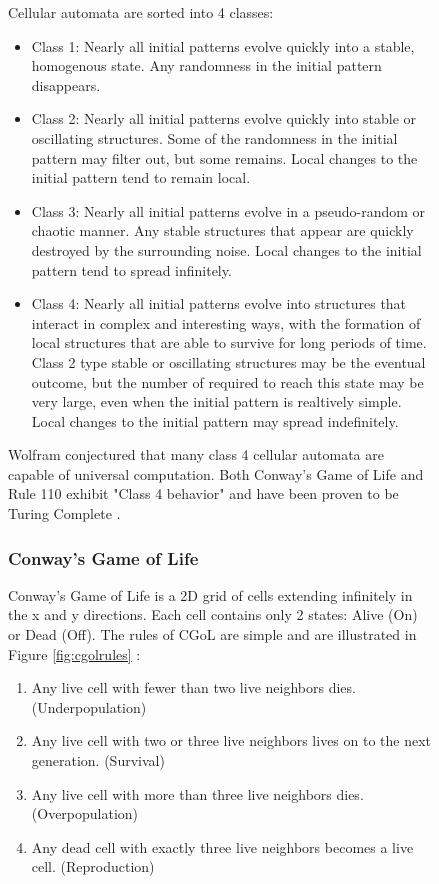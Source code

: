 \begin{figure}[htb]
Cellular automata are sorted into 4 classes:
\begin{itemize}
    \item Class 1: Nearly all initial patterns evolve quickly into a stable, homogenous state.
    Any randomness in the initial pattern disappears.
    \item Class 2: Nearly all initial patterns evolve quickly into stable or oscillating structures.
    Some of the randomness in the initial pattern may filter out, but some remains.
    Local changes to the initial pattern tend to remain local.
    \item Class 3: Nearly all initial patterns evolve in a pseudo-random or chaotic manner.
    Any stable structures that appear are quickly destroyed by the surrounding noise.
    Local changes to the initial pattern tend to spread infinitely.
    \item Class 4: Nearly all initial patterns evolve into structures that interact in complex and interesting ways, with the formation of local structures that are able to survive for long periods of time.
    Class 2 type stable or oscillating structures may be the eventual outcome, but the number of required to reach this state may be very large, even when the initial pattern is realtively simple.
    Local changes to the initial pattern may spread indefinitely.
\end{itemize}

Wolfram conjectured that many class 4 cellular automata are capable of universal computation.
Both Conway's Game of Life and Rule 110 exhibit "Class 4 behavior" and have been proven to be Turing Complete \cite{CGoLTM,CellAutBook}.

\subsubsection{Conway's Game of Life}\label{subsubsec:CGoL}

Conway's Game of Life is a 2D grid of cells extending infinitely in the x and y directions.
Each cell contains only 2 states: Alive (On) or Dead (Off).
The rules of CGoL are simple and are illustrated in Figure \ref{fig:cgolrules} \cite{CGoLImg}:

\begin{enumerate}
    \item Any live cell with fewer than two live neighbors dies. (Underpopulation)
    \item Any live cell with two or three live neighbors lives on to the next generation. (Survival)
    \item Any live cell with more than three live neighbors dies. (Overpopulation)
    \item Any dead cell with exactly three live neighbors becomes a live cell. (Reproduction)
\end{enumerate}


\end{figure}
